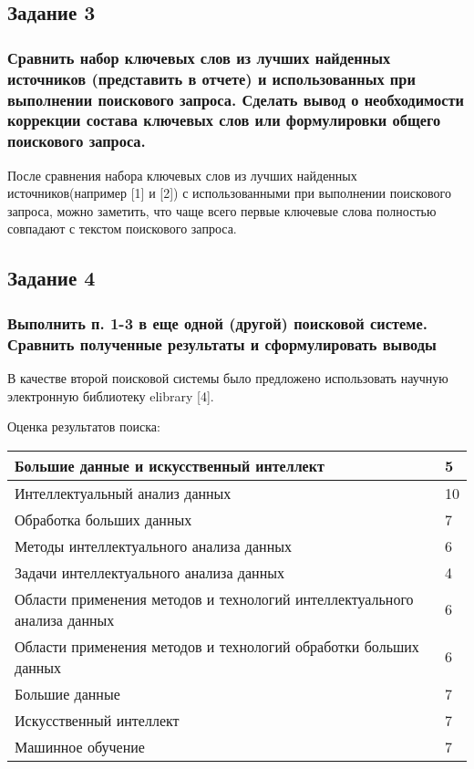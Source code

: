 \documentclass[14pt,a4paper,report]{report}
\begin{document}
\subsection{Задание 3}

\subsubsection{Сравнить набор ключевых слов из лучших найденных источников (представить в отчете) и использованных при выполнении поискового запроса. Сделать вывод о необходимости коррекции состава ключевых слов или формулировки общего поискового запроса.}

После сравнения набора ключевых слов из лучших найденных источников(например [1] и [2]) с использованными при выполнении поискового запроса, можно заметить, что чаще всего первые ключевые слова полностью совпадают с текстом поискового запроса.

\subsection{Задание 4}

\subsubsection{Выполнить п. 1-3 в еще одной (другой) поисковой системе. Сравнить полученные результаты и сформулировать выводы}

В качестве второй поисковой системы было предложено использовать научную электронную библиотеку elibrary [4].

Оценка результатов поиска:\\

\begin{tabular}{ | l | l | }
\hline
Большие данные и искусственный интеллект & 5 \\ \hline
Интеллектуальный анализ данных & 10 \\ \hline
Обработка больших данных & 7 \\ \hline
Методы интеллектуального анализа данных & 6\\ \hline
Задачи интеллектуального анализа данных & 4 \\ \hline
Области применения методов и технологий интеллектуального анализа данных & 6 \\ \hline
Области применения методов и технологий обработки больших данных & 6 \\ \hline
Большие данные & 7 \\ \hline
Искусственный интеллект & 7 \\ \hline
Машинное обучение & 7 \\
\hline
\end{tabular}\\
\end{document}
